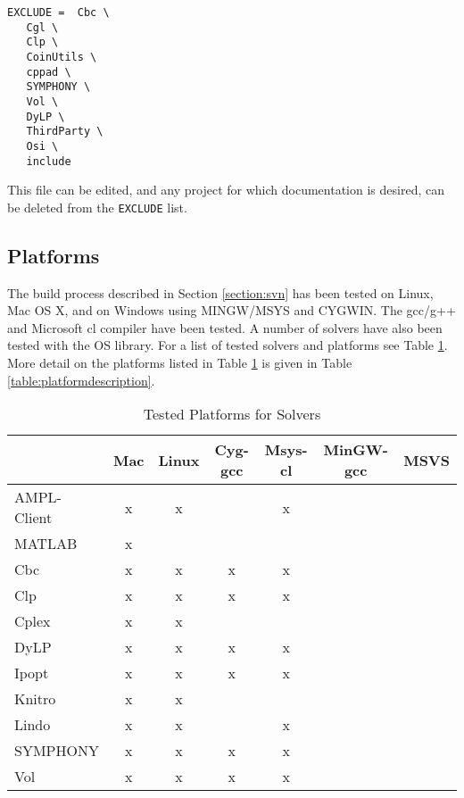 \documentclass[11pt]{article}
\renewcommand{\_}{{\char"5F}}
\renewcommand{\{}{{\char"7B}}
\renewcommand{\}}{{\char"7D}}
\renewcommand{\^}{{\char"0D}}
\renewcommand{\'}{{\char"0D}}
\begin{document}
\begin{verbatim}
EXCLUDE =  Cbc \ 
   Cgl \
   Clp \
   CoinUtils \
   cppad \
   SYMPHONY \
   Vol \
   DyLP \
   ThirdParty \
   Osi \
   include
\end{verbatim}

This file can be edited, and any project for which documentation is desired, can be deleted from the {\tt EXCLUDE} list.






\subsection{Platforms}

The build process described in Section \ref{section:svn} has been tested on Linux, Mac OS X, and on Windows using  MINGW/MSYS and CYGWIN. The  gcc/g++ and Microsoft  cl compiler have been tested. A number of solvers have also been tested with the OS library. For a list of tested solvers and platforms see Table \ref{table:testedplatforms}.  More detail on the platforms listed in Table  \ref{table:testedplatforms} is given in Table \ref{table:platformdescription}.


\begin{table}
\caption{Tested Platforms for Solvers}
\centering
\label{table:testedplatforms}
\vskip 8pt
 \begin{tabular}{l|c|c|c|c|c|c|}
 &Mac&Linux&Cyg-gcc&Msys-cl&MinGW-gcc&MSVS \\ \hline
AMPL-Client &x&x&&x&& \\ \hline
MATLAB &x&&&&& \\ \hline
Cbc &x&x&x&x&& \\ \hline
Clp &x&x&x&x&& \\ \hline
Cplex &x&x&&&& \\ \hline
DyLP &x&x&x&x&& \\ \hline
Ipopt &x&x&x&x&& \\ \hline
Knitro &x&x&&&& \\ \hline
Lindo &x&x&&x&& \\ \hline
SYMPHONY &x&x&x&x&& \\ \hline
Vol &x&x&x&x&& \\ \hline
\end{tabular}
\end{table}
 
\end{document}
